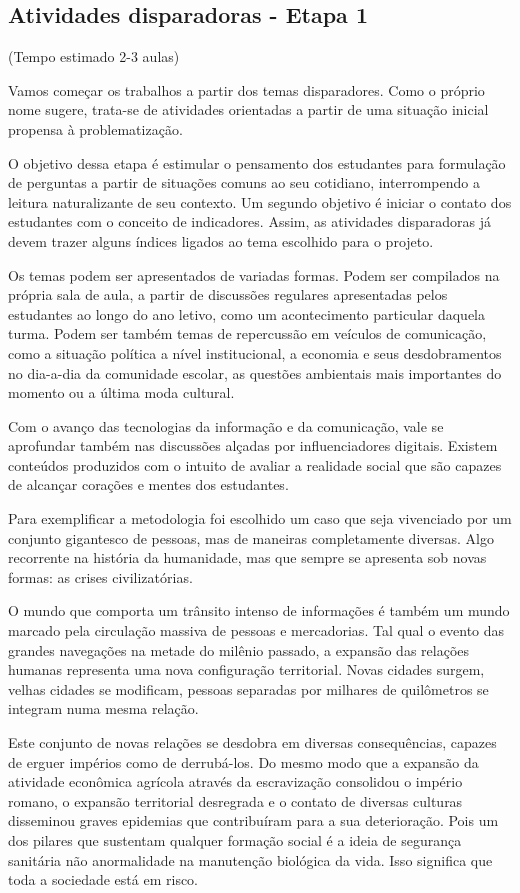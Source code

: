 \begin{paginatexto}
\section{Atividades disparadoras - Etapa 1}
(Tempo estimado 2-3 aulas)

Vamos começar os trabalhos a partir dos temas disparadores. Como o próprio nome sugere, trata-se de atividades orientadas a partir de uma situação inicial propensa à problematização.

O objetivo dessa etapa é estimular o pensamento dos estudantes para formulação de perguntas a partir de situações comuns ao seu cotidiano, interrompendo a leitura naturalizante de seu contexto. Um segundo objetivo é iniciar o contato dos estudantes com o conceito de indicadores. Assim, as atividades disparadoras já devem trazer alguns índices ligados ao tema escolhido para o projeto. 

Os temas podem ser apresentados de variadas formas. Podem ser compilados na própria sala de aula, a partir de discussões regulares apresentadas pelos estudantes ao longo do ano letivo, como um acontecimento particular daquela turma. Podem ser também temas de repercussão em veículos de comunicação, como a situação política a nível institucional, a economia e seus desdobramentos no dia-a-dia da comunidade escolar, as questões ambientais mais importantes do momento ou a última moda cultural.

Com o avanço das tecnologias da informação e da comunicação, vale se aprofundar também nas discussões alçadas por influenciadores digitais. Existem conteúdos produzidos com o intuito de avaliar a realidade social que são capazes de alcançar corações e mentes dos estudantes.

Para exemplificar a metodologia foi escolhido um caso que seja vivenciado por um conjunto gigantesco de pessoas, mas de maneiras completamente diversas. Algo recorrente na história da humanidade, mas que sempre se apresenta sob novas formas: as crises civilizatórias.

O mundo que comporta um trânsito intenso de informações é também um mundo marcado pela circulação massiva de pessoas e mercadorias. Tal qual o evento das grandes navegações na metade do milênio passado, a expansão das relações humanas representa uma nova configuração territorial. Novas cidades surgem, velhas cidades se modificam, pessoas separadas por milhares de quilômetros se integram numa mesma relação.

Este conjunto de novas relações se desdobra em diversas consequências, capazes de erguer impérios como de derrubá-los. Do mesmo modo que a expansão da atividade econômica agrícola através da escravização consolidou o império romano, o expansão territorial desregrada e o contato de diversas culturas disseminou graves epidemias que contribuíram para a sua deterioração. Pois um dos pilares que sustentam qualquer formação social é a ideia de segurança sanitária não anormalidade na manutenção biológica da vida. Isso significa que toda a sociedade está em risco.


\end{paginatexto}
